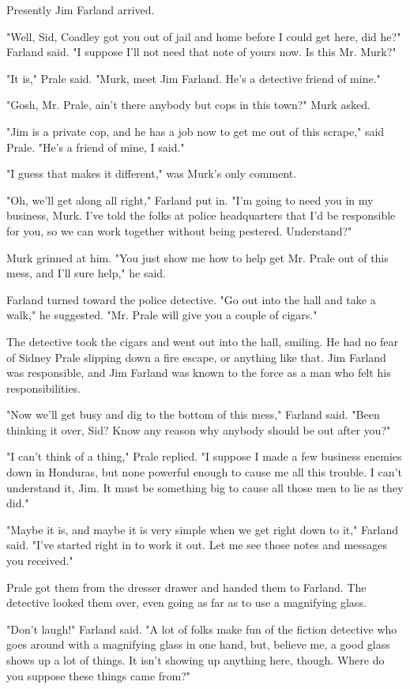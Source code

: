 \documentclass{novel}
\begin{document}
Presently Jim Farland arrived.

"Well, Sid, Coadley got you out of jail and home before I could get here, did he?" Farland said. "I suppose I'll not need that note of yours now. Is this Mr. Murk?"

"It is," Prale said. "Murk, meet Jim Farland. He's a detective friend of mine."

"Gosh, Mr. Prale, ain't there anybody but cops in this town?" Murk asked.

"Jim is a private cop, and he has a job now to get me out of this scrape," said Prale. "He's a friend of mine, I said."

"I guess that makes it different," was Murk's only comment.

"Oh, we'll get along all right," Farland put in. "I'm going to need you in my business, Murk. I've told the folks at police headquarters that I'd be responsible for you, so we can work together without being pestered. Understand?"

Murk grinned at him. "You just show me how to help get Mr. Prale out of this mess, and I'll sure help," he said.

Farland turned toward the police detective. "Go out into the hall and take a walk," he suggested. "Mr. Prale will give you a couple of cigars."

The detective took the cigars and went out into the hall, smiling. He had no fear of Sidney Prale slipping down a fire escape, or anything like that. Jim Farland was responsible, and Jim Farland was known to the force as a man who felt his responsibilities.

"Now we'll get busy and dig to the bottom of this mess," Farland said. "Been thinking it over, Sid? Know any reason why anybody should be out after you?"

"I can't think of a thing," Prale replied. "I suppose I made a few business enemies down in Honduras, but none powerful enough to cause me all this trouble. I can't understand it, Jim. It must be something big to cause all those men to lie as they did."

"Maybe it is, and maybe it is very simple when we get right down to it," Farland said. "I've started right in to work it out. Let me see those notes and messages you received."

Prale got them from the dresser drawer and handed them to Farland. The detective looked them over, even going as far as to use a magnifying glass.

"Don't laugh!" Farland said. "A lot of folks make fun of the fiction detective who goes around with a magnifying glass in one hand, but, believe me, a good glass shows up a lot of things. It isn't showing up anything here, though. Where do you suppose these things came from?"
\end{document}
